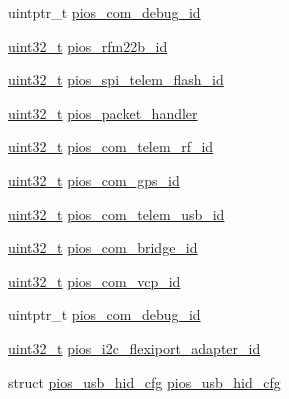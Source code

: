 \begin{DoxyCompactItemize}
\item 
uintptr\-\_\-t \hyperlink{group___open_pilot_core_ga14dc9e3d330b80a37a9699c2112358e0}{pios\-\_\-com\-\_\-debug\-\_\-id}
\item 
\hyperlink{stdint_8h_a435d1572bf3f880d55459d9805097f62}{uint32\-\_\-t} \hyperlink{group___open_pilot_core_ga1e0b7d2eb8b8640e07daa1f381780972}{pios\-\_\-rfm22b\-\_\-id}
\item 
\hyperlink{stdint_8h_a435d1572bf3f880d55459d9805097f62}{uint32\-\_\-t} \hyperlink{group___open_pilot_core_gabcea731eedc7b51eae0e4074e35fc8c1}{pios\-\_\-spi\-\_\-telem\-\_\-flash\-\_\-id}
\item 
\hyperlink{stdint_8h_a435d1572bf3f880d55459d9805097f62}{uint32\-\_\-t} \hyperlink{group___open_pilot_core_gab0199d5aedb7be35cb1d6880ee21f8ac}{pios\-\_\-packet\-\_\-handler}
\item 
\hyperlink{stdint_8h_a435d1572bf3f880d55459d9805097f62}{uint32\-\_\-t} \hyperlink{group___open_pilot_core_ga81f6bbc74499d8041b498fd84393191e}{pios\-\_\-com\-\_\-telem\-\_\-rf\-\_\-id}
\item 
\hyperlink{stdint_8h_a435d1572bf3f880d55459d9805097f62}{uint32\-\_\-t} \hyperlink{group___open_pilot_core_gaaf87638a9e94d36dff49d099d8f82d62}{pios\-\_\-com\-\_\-gps\-\_\-id}
\item 
\hyperlink{stdint_8h_a435d1572bf3f880d55459d9805097f62}{uint32\-\_\-t} \hyperlink{group___open_pilot_core_ga1ec5827cb1b86c4db093bbd681d6960e}{pios\-\_\-com\-\_\-telem\-\_\-usb\-\_\-id}
\item 
\hyperlink{stdint_8h_a435d1572bf3f880d55459d9805097f62}{uint32\-\_\-t} \hyperlink{group___open_pilot_core_ga3f8f3a743f397ca978e7f74e2f21a926}{pios\-\_\-com\-\_\-bridge\-\_\-id}
\item 
\hyperlink{stdint_8h_a435d1572bf3f880d55459d9805097f62}{uint32\-\_\-t} \hyperlink{group___open_pilot_core_gac35e351683a54ecb1c2816979a1dd5d8}{pios\-\_\-com\-\_\-vcp\-\_\-id}
\item 
uintptr\-\_\-t \hyperlink{group___open_pilot_core_ga14dc9e3d330b80a37a9699c2112358e0}{pios\-\_\-com\-\_\-debug\-\_\-id}
\item 
\hyperlink{stdint_8h_a435d1572bf3f880d55459d9805097f62}{uint32\-\_\-t} \hyperlink{group___open_pilot_core_ga20b68de0b754d943d653d816aad86148}{pios\-\_\-i2c\-\_\-flexiport\-\_\-adapter\-\_\-id}
\item 
struct \hyperlink{structpios__usb__hid__cfg}{pios\-\_\-usb\-\_\-hid\-\_\-cfg} \hyperlink{group___open_pilot_core_ga3665f6d3a2cccc431b55b9432291e94c}{pios\-\_\-usb\-\_\-hid\-\_\-cfg}

\end{DoxyCompactItemize}
